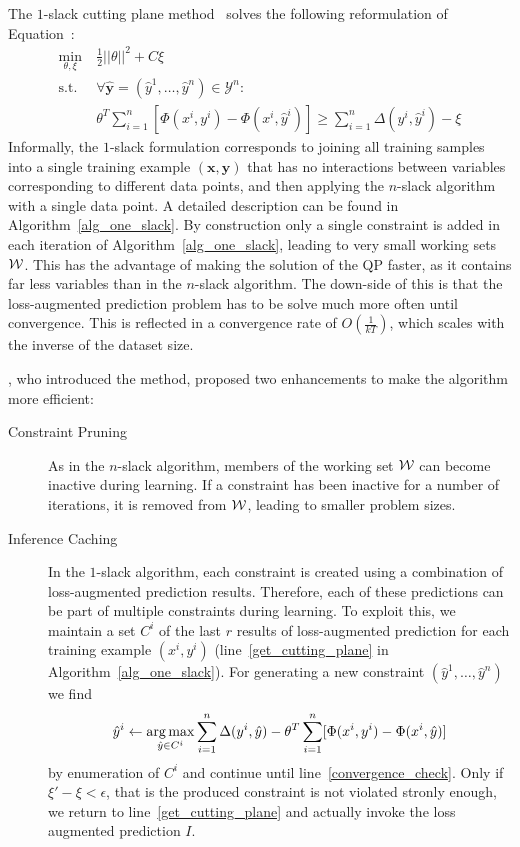 The $1$-slack cutting plane method~\citep{joachims2009cutting} solves the
following reformulation of Equation~:
\begin{align}\label{eq:oneslack}
    \min_{\theta, \xi}\ &\frac{1}{2} ||\theta||^2 + C \xi\\
    \text{s.t. }&\forall \hat{\mathbf{y}}=(\hat{y}^1, \dots, \hat{y}^n) \in \mathcal{Y}^n:\\
        &\theta^T \sum_{i=1}^n [\Phi(x^i, y^i) - \Phi(x^i,
            \hat{y}^i)] \geq \sum_{i=1}^n \Delta(y^i, \hat{y}^i)
            - \xi
\end{align}
Informally, the $1$-slack formulation corresponds to joining all training
samples into a single training example $(\mathbf{x}, \mathbf{y})$ that has no
interactions between variables corresponding to different data points, and
then applying the $n$-slack algorithm with a single data point.
A detailed description can be found in Algorithm~\ref{alg_one_slack}.
%
By construction only a single constraint is added in each iteration of
Algorithm~\ref{alg_one_slack}, leading to very small working sets $\mathcal{W}$.
This has the advantage of making the solution of the QP faster, as it contains far
less variables than in the $n$-slack algorithm. The down-side of this is that
the loss-augmented prediction problem has to be solve much more often until
convergence. This is reflected in a convergence rate of $O(\frac{1}{kT})$,
which scales with the inverse of the dataset size.

\citet{joachims2009cutting}, who introduced the method, proposed two enhancements
to make the algorithm more efficient:
\begin{description}
    \item[Constraint Pruning] As in the $n$-slack algorithm, members of the
        working set $\mathcal{W}$ can become inactive during learning.  If a constraint
        has been inactive for a number of iterations, it is removed from $\mathcal{W}$,
        leading to smaller problem sizes.
    \item[Inference Caching] In the $1$-slack algorithm, each constraint is
        created using a combination of loss-augmented prediction results.
        Therefore, each of these predictions can be part of multiple
        constraints during learning.
        To exploit this, we maintain a set $C^i$ of the last $r$ results of
        loss-augmented prediction for each training example $(x^i, y^i)$
        (line~\ref{get_cutting_plane} in Algorithm~\ref{alg_one_slack}).
        For generating a new constraint $(\hat{y}^1, \dotsc, \hat{y}^n)$ we
        find
        \[ \hat{y}^i \leftarrow \operatorname*{arg\,max}_{\hat{y}\in C^i} \sum_{i=1}^n
            \Delta(y^i, \hat{y}) - \theta^T \sum_{i=1}^n [\Phi(x^i, y^i) -
                \Phi(x^i, \hat{y})] \]
        by enumeration of $C^i$ and continue until
        line~\ref{convergence_check}.  Only if $\xi' - \xi < \epsilon$, that is
        the produced constraint is not violated stronly enough, we return to
        line~\ref{get_cutting_plane} and actually invoke the loss augmented
        prediction $I$.
\end{description}


